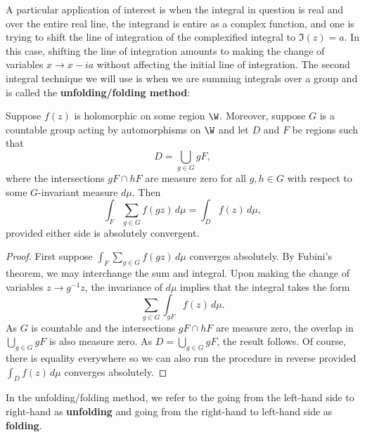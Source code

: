       A particular application of interest is when the integral in question is real and over the entire real line, the integrand is entire as a complex function, and one is trying to shift the line of integration of the complexified integral to $\Im(z) = a$. In this case, shifting the line of integration amounts to making the change of variables $x \to x-ia$ without affecting the initial line of integration. The second integral technique we will use is when we are summing integrals over a group and is called the \textbf{unfolding/folding method}:

      \begin{theorem}
        Suppose $f(z)$ is holomorphic on some region $\W$. Moreover, suppose $G$ is a countable group acting by automorphisms on $\W$ and let $D$ and $F$ be regions such that
        \[
          D = \bigcup_{g \in G}gF,
        \]
        where the intersections $gF \cap hF$ are measure zero for all $g,h \in G$ with respect to some $G$-invariant measure $d\mu$. Then 
        \[
          \int_{F}\sum_{g \in G}f(g z)\,d\mu = \int_{D}f(z)\,d\mu,
        \]
        provided either side is absolutely convergent.
      \end{theorem}
      \begin{proof}
        First suppose $\int_{F}\sum_{g \in G}f(g z)\,d\mu$ converges absolutely. By Fubini's theorem, we may interchange the sum and integral. Upon making the change of variables $z \to g^{-1}z$, the invariance of $d\mu$ implies that the integral takes the form
        \[
          \sum_{g \in G}\int_{gF}f(z)\,d\mu.
        \]
        As $G$ is countable and the intersections $gF \cap hF$ are measure zero, the overlap in $\bigcup_{g \in G}gF$ is also measure zero. As $D = \bigcup_{g \in G}gF$, the result follows. Of course, there is equality everywhere so we can also run the procedure in reverse provided $\int_{D}f(z)\,d\mu$ converges absolutely.
      \end{proof}

      In the unfolding/folding method, we refer to the going from the left-hand side to right-hand as \textbf{unfolding} and going from the right-hand to left-hand side as \textbf{folding}.
